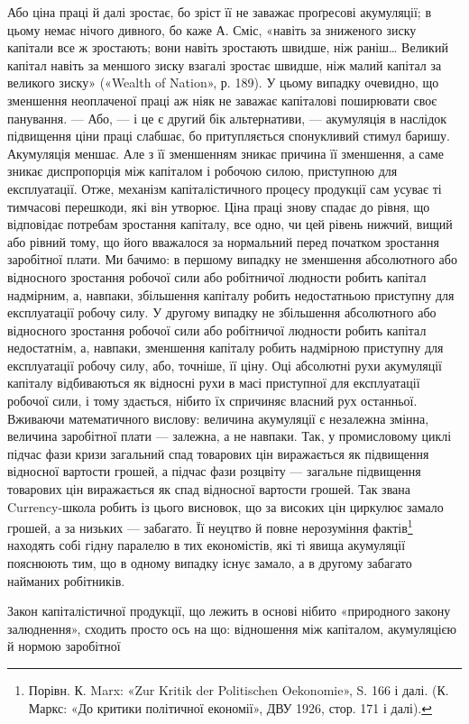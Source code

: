 Або ціна праці й далі зростає, бо зріст її не заважає проґресові
акумуляції; в цьому немає нічого дивного, бо каже А. Сміс,
«навіть за зниженого зиску капітали все ж зростають; вони навіть
зростають швидше, ніж раніш\dots{} Великий капітал навіть
за меншого зиску взагалі зростає швидше, ніж малий капітал за
великого зиску» («Wealth of Nation», р. 189). У цьому випадку
очевидно, що зменшення неоплаченої праці аж ніяк не заважає
капіталові поширювати своє панування. — Або, — і це є другий
бік альтернативи, — акумуляція в наслідок підвищення ціни
праці слабшає, бо притупляється спонукливий стимул баришу.
Акумуляція меншає. Але з її зменшенням зникає причина її
зменшення, а саме зникає диспропорція між капіталом і робочою
силою, приступною для експлуатації. Отже, механізм капіталістичного
процесу продукції сам усуває ті тимчасові перешкоди,
які він утворює. Ціна праці знову спадає до рівня, що
відповідає потребам зростання капіталу, все одно, чи цей рівень
нижчий, вищий або рівний тому, що його вважалося за нормальний
перед початком зростання заробітної плати. Ми бачимо:
в першому випадку не зменшення абсолютного або відносного
зростання робочої сили або робітничої людности робить капітал
надмірним, а, навпаки, збільшення капіталу робить недостатньою
приступну для експлуатації робочу силу. У другому випадку
не збільшення абсолютного або відносного зростання робочої
сили або робітничої людности робить капітал недостатнім, а,
навпаки, зменшення капіталу робить надмірною приступну для
експлуатації робочу силу, або, точніше, її ціну. Оці абсолютні
рухи акумуляції капіталу відбиваються як відносні рухи в масі
приступної для експлуатації робочої сили, і тому здається, нібито
їх спричиняє власний рух останньої. Вживаючи математичного
вислову: величина акумуляції є незалежна змінна, величина
заробітної плати — залежна, а не навпаки. Так, у промисловому
циклі підчас фази кризи загальний спад товарових цін виражається
як підвищення відносної вартости грошей, а підчас фази
розцвіту — загальне підвищення товарових цін виражається як
спад відносної вартости грошей. Так звана Currency-школа
робить із цього висновок, що за високих цін циркулює замало
грошей, а за низьких — забагато. Її неуцтво й повне нерозуміння
фактів\footnote{
Порівн. К. Marx: «Zur Kritik der Politischen Oekonomie»,
S. 166 і далі. (К. Маркс: «До критики політичної економії», ДВУ 1926,
стор. 171 і далі).
} находять собі гідну паралелю в тих економістів,
які ті явища акумуляції пояснюють тим, що в одному випадку
існує замало, а в другому забагато найманих робітників.

Закон капіталістичної продукції, що лежить в основі нібито
«природного закону залюднення», сходить просто ось на що:
відношення між капіталом, акумуляцією й нормою заробітної
\parbreak{}  %
